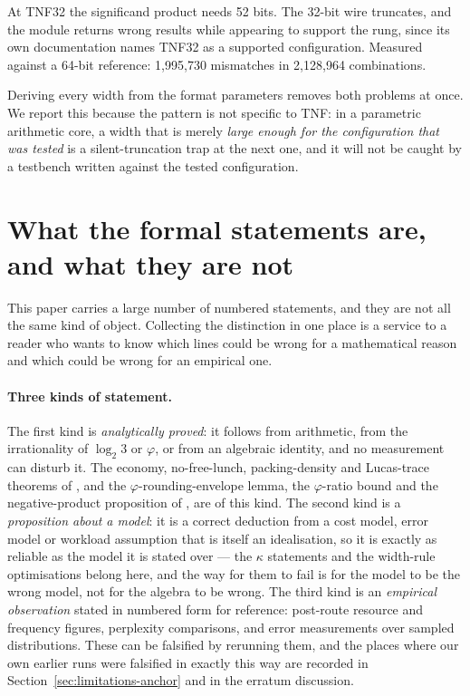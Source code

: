 At TNF32 the significand product needs 52 bits. The 32-bit wire truncates, and
the module returns wrong results while appearing to support the rung, since its
own documentation names TNF32 as a supported configuration. Measured against a
64-bit reference: 1{,}995{,}730 mismatches in 2{,}128{,}964 combinations.

Deriving every width from the format parameters removes both problems at once. We
report this because the pattern is not specific to TNF: in a parametric
arithmetic core, a width that is merely \emph{large enough for the configuration
that was tested} is a silent-truncation trap at the next one, and it will not be
caught by a testbench written against the tested configuration.


\section{What the formal statements are, and what they are
not}\label{sec:statusofstatements}

This paper carries a large number of numbered statements, and they are not all the
same kind of object. Collecting the distinction in one place is a service to a
reader who wants to know which lines could be wrong for a mathematical reason and
which could be wrong for an empirical one.

\paragraph{Three kinds of statement.} The first kind is \emph{analytically
proved}: it follows from arithmetic, from the irrationality of $\log_2 3$ or
$\varphi$, or from an algebraic identity, and no measurement can disturb it.
The economy, no-free-lunch, packing-density and Lucas-trace theorems of
\companionname, and the $\varphi$-rounding-envelope lemma, the
$\varphi$-ratio bound and the negative-product proposition of \recordname,
are of this kind. The second kind is a
\emph{proposition about a model}: it is a correct deduction from a cost model,
error model or workload assumption that is itself an idealisation, so it is exactly
as reliable as the model it is stated over --- the $\kappa$ statements and the
width-rule optimisations belong here, and the way for them to fail is for the
model to be the wrong model, not for the algebra to be wrong. The third kind is an
\emph{empirical observation} stated in numbered form for reference: post-route
resource and frequency figures, perplexity comparisons, and error measurements
over sampled distributions. These can be falsified by rerunning them, and the
places where our own earlier runs were falsified in exactly this way are recorded
in Section~\ref{sec:limitations-anchor} and in the erratum discussion.

